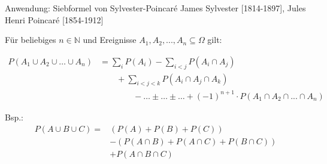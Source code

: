 \documentclass[
  10pt,
  ignorenonframetext,
]{beamer}
\begin{document}
\begin{frame}{Anwendung: Siebformel von Sylvester-Poincaré}
\protect\hypertarget{anwendung-siebformel-von-sylvester-poincaruxe9}{}
James Sylvester {[}1814-1897{]}, Jules Henri Poincaré {[}1854-1912{]}

Für beliebiges \(n \in \mathbb{N}\) und Ereignisse
\(A_1, A_2,..., A_n \subseteq \Omega\) gilt:

\begin{align*}
P(A_1 \cup A_2 \cup \dots \cup A_n) & = \sum_i P(A_i) - \sum_{i < j} P(A_i \cap A_j)\\
& \qquad + \sum_{i < j < k} P(A_i \cap A_j \cap A_k)\\
& \qquad \qquad - \dots \pm \dots \pm \dots + (-1)^{n+1} \cdot P(A_1 \cap A_2 \cap ... \cap A_n)
\end{align*}

Bsp.: \begin{align*}
P(A \cup B \cup C)  =& (P(A) + P(B) + P(C))  \\
                     &  - (P(A \cap B) + P(A \cap C) + P(B \cap C)) \\
                     &    + P(A \cap B \cap C)
\end{align*}
\end{frame}
\end{document}
